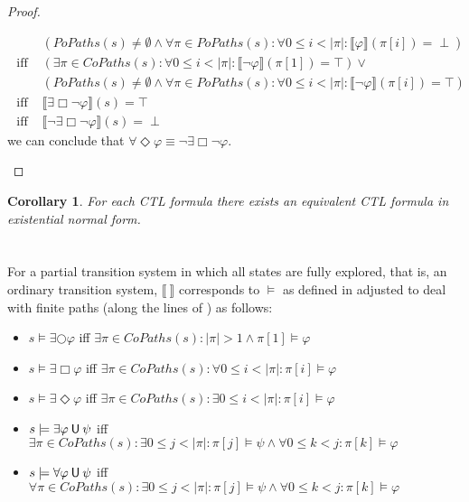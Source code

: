 \documentclass[12pt]{article}
\newcommand{\always}{\Box}
\newcommand{\eventually}{\Diamond}
\newcommand{\nxt}{\bigcirc}
\newcommand{\until}{\mathbin{\sf U}}
\newtheorem{corollary}{Corollary}
\theoremstyle{definition}
\newcommand{\satisfaction}[1]{\llbracket #1 \rrbracket}
\newenvironment{franck}{\color{red}}{\color{black}}
\begin{document}
\begin{franck}
\begin{proof}
\begin{enumerate}
\begin{align*}
& (\mathit{PoPaths}(s) \not= \emptyset \wedge \forall \pi \in \mathit{PoPaths}(s) : \forall 0 \leq i < |\pi| : \satisfaction{\varphi}(\pi[i]) = \perp)\\
\mbox{ iff } & (\exists \pi \in \mathit{CoPaths}(s) : \forall 0 \leq i < |\pi| : \satisfaction{\neg \varphi}(\pi[1]) = \top) \vee\\
& (\mathit{PoPaths}(s) \not= \emptyset \wedge \forall \pi \in \mathit{PoPaths}(s) : \forall 0 \leq i < |\pi| : \satisfaction{\neg \varphi}(\pi[i]) = \top)\\
\mbox{ iff } & \satisfaction{\exists \always \neg \varphi}(s) = \top\\
\mbox{ iff } & \satisfaction{\neg \exists \always \neg \varphi}(s) = \perp
\end{align*}
we can conclude that $\forall \eventually \varphi \equiv \neg \exists \always \neg \varphi$.
\end{enumerate}
\end{proof}

\begin{corollary}
For each CTL formula there exists an equivalent CTL formula in existential normal form.
\end{corollary}

\end{franck}

\section{}

For a partial transition system in which all states are fully explored, that is, an ordinary transition system, $\satisfaction{\ }$ corresponds to $\models$ as defined in \cite[Definition~6.4]{BK08} adjusted to deal with finite paths (along the lines of \cite{GV13}) as follows:
\begin{itemize}
\begin{franck}
\item 
$s \models \exists \nxt \varphi$ iff $\exists \pi \in \mathit{CoPaths}(s): |\pi| > 1 \wedge \pi[1] \models \varphi$ 
\item
$s \models \exists \always \varphi$ iff $\exists \pi \in \mathit{CoPaths}(s) : \forall 0 \leq i < |\pi| : \pi[i] \models \varphi$
\item
$s \models \exists \eventually \varphi$ iff $\exists \pi \in \mathit{CoPaths}(s) : \exists 0 \leq i < |\pi| : \pi[i] \models \varphi$
\end{franck}
\item
$s \models \exists \varphi \until \psi$ iff $\exists \pi \in \mathit{CoPaths}(s) : \exists 0 \leq j < |\pi| : \pi[j] \models \psi \wedge \forall 0 \leq k < j : \pi[k] \models \varphi$
\item 
$s \models \forall \varphi \until \psi$ iff $\forall \pi \in \mathit{CoPaths}(s) : \exists 0 \leq j < |\pi| : \pi[j] \models \psi \wedge \forall 0 \leq k < j : \pi[k] \models \varphi$
\end{itemize}
\end{document}
